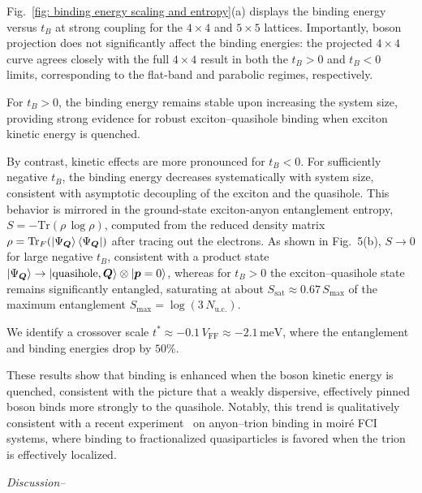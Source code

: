 \documentclass[aps,prl,twocolumn,amsmath,amssymb,nofootinbib,superscriptaddress,floatfix]{revtex4-1}
\newcommand{\bs}[1]{{\boldsymbol{#1}}}
\begin{document}
{{Fig.~\ref{fig: binding energy scaling and entropy}(a) displays the binding energy versus $t_B$ at strong coupling for the $4 \times 4$ and $5 \times 5$ lattices. Importantly, boson projection does not significantly affect the binding energies: the projected $4\times4$ curve agrees closely with the full $4\times4$ result in both the $t_B>0$ and $t_B<0$ limits, corresponding to the flat-band and parabolic regimes, respectively.

For $t_B>0$, the binding energy remains stable upon increasing the system size, providing strong evidence for robust exciton--quasihole binding  when exciton kinetic energy is quenched.
}

{By contrast, kinetic effects are more pronounced for $t_B < 0$. For sufficiently negative $t_B$, the binding energy decreases systematically with system size, consistent with asymptotic decoupling of the exciton and the quasihole. This behavior is mirrored in the ground-state exciton-anyon entanglement entropy,
$S = -\mathrm{Tr}(\rho\,\log \rho)$,
computed from the reduced density matrix $\rho = \mathrm{Tr}_{F}(\ket{\Psi_{\bs{Q}}}\bra{\Psi_{\bs{Q}}})$ after tracing out the electrons. As shown in Fig.~5(b), $S \to 0$ for large negative $t_B$, consistent with a product state $\ket{\Psi_{\bs{Q}}} \rightarrow |\mathrm{quasihole},\bs{Q}\rangle \otimes |\boldsymbol{p}=0\rangle$, whereas for $t_B > 0$ the exciton--quasihole state remains significantly entangled, saturating at  about $S_{\textrm{sat}} \approx 0.67\,S_{\max}$
of the maximum entanglement $S_{\max} = \log(3\,N_{\textrm{u.c.}})$.

We identify a crossover scale $t^{*} \approx -0.1\,V_{\mathrm{FF}} \approx -2.1\,\mathrm{meV}$, where the entanglement and binding energies drop by $50\%$.

These results show that binding is enhanced when the boson kinetic energy is quenched, consistent with the picture that a weakly dispersive, effectively pinned boson binds more strongly to the quasihole. Notably, this trend is qualitatively consistent with a recent experiment~\cite{li2026signatures} on anyon--trion binding in moir\'e FCI systems, where binding to fractionalized quasiparticles is favored when the trion is effectively localized.}





}





\noindent
\textit{Discussion--}
\end{document}
